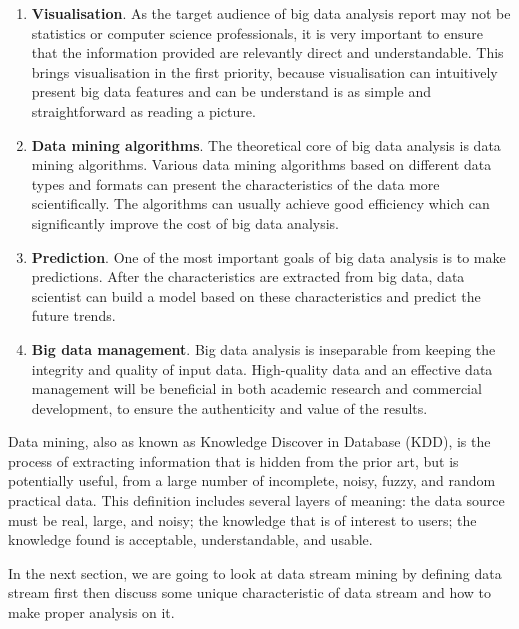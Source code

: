 \begin{enumerate}

    \item \textbf{Visualisation}. As the target audience of big data analysis report may not be statistics or computer science professionals, it is very important to ensure that the information provided are relevantly direct and understandable. This brings visualisation in the first priority, because visualisation can intuitively present big data features and can be understand is as simple and straightforward as reading a picture.
    
    \item \textbf{Data mining algorithms}. The theoretical core of big data analysis is data mining algorithms. Various data mining algorithms based on different data types and formats can present the characteristics of the data more scientifically. The algorithms can usually achieve good efficiency which can significantly improve the cost of big data analysis.
    
    \item \textbf{Prediction}. One of the most important goals of big data analysis is to make predictions. After the characteristics are extracted from big data, data scientist can build a model based on these characteristics and predict the future trends. 
    
    \item \textbf{Big data management}. Big data analysis is inseparable from keeping the integrity and quality of input data. High-quality data and an effective data management will be beneficial in both academic research and commercial development, to ensure the authenticity and value of the results.
    
\end{enumerate}

Data mining, also as known as Knowledge Discover in Database (KDD), is the process of extracting information that is hidden from the prior art, but is potentially useful, from a large number of incomplete, noisy, fuzzy, and random practical data. This definition includes several layers of meaning: the data source must be real, large, and noisy; the knowledge that is of interest to users; the knowledge found is acceptable, understandable, and usable.

In the next section, we are going to look at data stream mining by defining data stream first then discuss some unique characteristic of data stream and how to make proper analysis on it.


